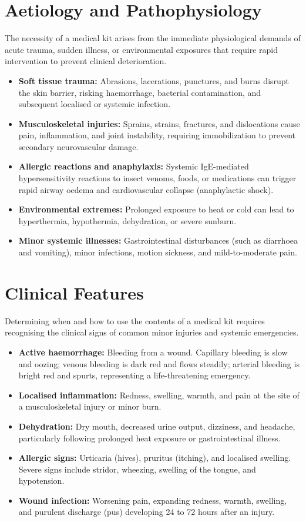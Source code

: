 \section*{Aetiology and Pathophysiology}
The necessity of a medical kit arises from the immediate physiological demands of acute trauma, sudden illness, or environmental exposures that require rapid intervention to prevent clinical deterioration.
\begin{itemize}
    \item \textbf{Soft tissue trauma:} Abrasions, lacerations, punctures, and burns disrupt the skin barrier, risking haemorrhage, bacterial contamination, and subsequent localised or systemic infection.
    \item \textbf{Musculoskeletal injuries:} Sprains, strains, fractures, and dislocations cause pain, inflammation, and joint instability, requiring immobilization to prevent secondary neurovascular damage.
    \item \textbf{Allergic reactions and anaphylaxis:} Systemic IgE-mediated hypersensitivity reactions to insect venoms, foods, or medications can trigger rapid airway oedema and cardiovascular collapse (anaphylactic shock).
    \item \textbf{Environmental extremes:} Prolonged exposure to heat or cold can lead to hyperthermia, hypothermia, dehydration, or severe sunburn.
    \item \textbf{Minor systemic illnesses:} Gastrointestinal disturbances (such as diarrhoea and vomiting), minor infections, motion sickness, and mild-to-moderate pain.
\end{itemize}

\section*{Clinical Features}
Determining when and how to use the contents of a medical kit requires recognising the clinical signs of common minor injuries and systemic emergencies.
\begin{itemize}
    \item \textbf{Active haemorrhage:} Bleeding from a wound. Capillary bleeding is slow and oozing; venous bleeding is dark red and flows steadily; arterial bleeding is bright red and spurts, representing a life-threatening emergency.
    \item \textbf{Localised inflammation:} Redness, swelling, warmth, and pain at the site of a musculoskeletal injury or minor burn.
    \item \textbf{Dehydration:} Dry mouth, decreased urine output, dizziness, and headache, particularly following prolonged heat exposure or gastrointestinal illness.
    \item \textbf{Allergic signs:} Urticaria (hives), pruritus (itching), and localised swelling. Severe signs include stridor, wheezing, swelling of the tongue, and hypotension.
    \item \textbf{Wound infection:} Worsening pain, expanding redness, warmth, swelling, and purulent discharge (pus) developing 24 to 72 hours after an injury.
\end{itemize}

